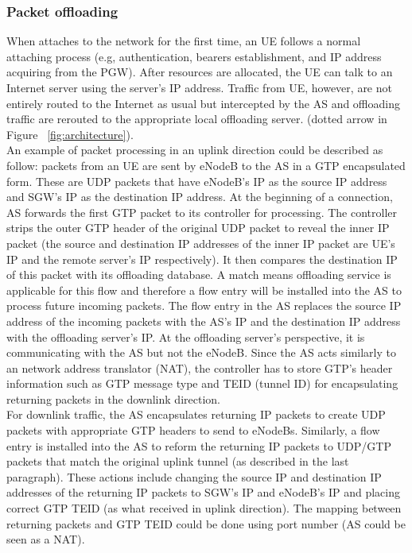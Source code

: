 \subsubsection{Packet offloading}

When attaches to the network for the first time, 
an UE follows a normal attaching process (e.g,
authentication, bearers establishment, and IP address acquiring 
from the PGW). After resources are 
allocated, the UE can talk to an Internet server using the 
server's IP address. Traffic from UE, however, are 
not entirely routed to the Internet as usual but intercepted 
by the AS and offloading traffic 
are rerouted to the appropriate local offloading server.
(dotted arrow in Figure ~\ref{fig:architecture}).\\

An example of packet processing in an uplink direction could be described 
as follow: packets from an UE are sent by eNodeB to the 
AS in a GTP encapsulated form. These are UDP packets that have eNodeB's IP as 
the source IP address and SGW's IP as the destination IP address. At the beginning of a connection, 
AS forwards the first GTP packet to its controller for processing. The controller strips the outer GTP header of 
the original UDP packet to reveal the inner IP packet 
(the source and destination IP addresses of the inner IP packet 
are UE's IP and the remote server's IP respectively). It then compares 
the destination IP of this packet with its offloading database. A match 
means offloading service is applicable for this flow and 
therefore a flow entry will be installed into the AS to process future incoming packets. 
The flow entry in the AS replaces the source IP address of the incoming packets with the 
AS's IP and the destination IP address with the offloading server's IP. 
At the offloading server's perspective, it is communicating with the AS but not the eNodeB. 
Since the AS acts similarly to an network address translator (NAT), the controller has 
to store GTP's header information such as GTP message type and TEID (tunnel ID) 
for encapsulating returning packets in the downlink direction.\\

For downlink traffic, the AS encapsulates returning IP packets to 
create UDP packets with appropriate GTP headers to send to eNodeBs. 
Similarly, a flow entry is installed into the AS to reform 
the returning IP packets to UDP/GTP packets that match the original uplink tunnel (as described in the last 
paragraph). These actions include changing the source IP and destination IP addresses of the returning IP 
packets to SGW's IP 
and eNodeB's IP and placing correct GTP TEID (as what received in uplink direction). 
The mapping between returning packets and  
GTP TEID could be done using port number (AS could be seen as a NAT).






